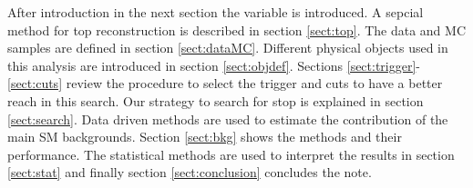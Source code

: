 After introduction in the next section the \mttwo variable is introduced. 
A sepcial method for top reconstruction is described in section \ref{sect:top}.
The data and MC samples are defined in section \ref{sect:dataMC}. 
Different physical objects used in this analysis are introduced in section \ref{sect:objdef}. 
Sections \ref{sect:trigger}-\ref{sect:cuts} review the procedure to 
select the trigger and cuts to have a better reach in this search.
Our strategy to search for stop is explained in section \ref{sect:search}.
Data driven methods are used to estimate the contribution of the main SM backgrounds. 
Section \ref{sect:bkg} shows the methods and their performance.
The statistical methods are used to interpret the results in section \ref{sect:stat} and finally section \ref{sect:conclusion} concludes the note.



